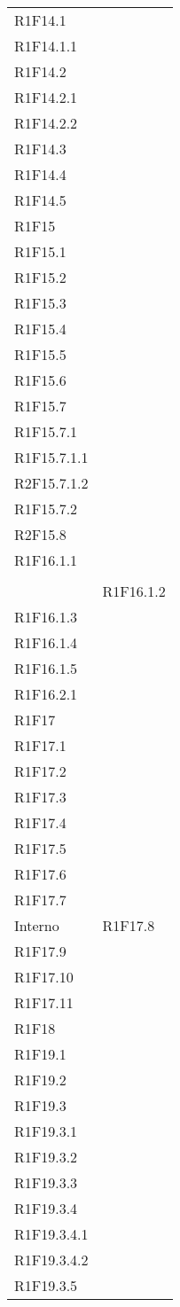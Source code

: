 \begin{longtable}{ >{\centering}p{}
			>{\centering}p{}}
		R1F14.1\\
		R1F14.1.1\\
		R1F14.2\\
		R1F14.2.1\\
		R1F14.2.2\\
		R1F14.3\\
		R1F14.4\\
		R1F14.5\\
		R1F15\\
		R1F15.1\\
		R1F15.2\\
		R1F15.3\\
		R1F15.4\\
		R1F15.5\\
		R1F15.6\\
		R1F15.7\\
		R1F15.7.1\\
		R1F15.7.1.1\\
		R2F15.7.1.2\\
		R1F15.7.2\\
		R2F15.8\\
		R1F16.1.1
		\tabularnewline \rowcolordark
		&
		\tabularnewline 
		&
		R1F16.1.2\\
		R1F16.1.3\\
		R1F16.1.4\\
		R1F16.1.5\\
		R1F16.2.1\\
		R1F17\\
		R1F17.1\\
		R1F17.2\\
		R1F17.3\\
		R1F17.4\\
		R1F17.5\\
		R1F17.6\\
		R1F17.7 \tabularnewline
		Interno	&
		R1F17.8\\
		R1F17.9\\
		R1F17.10\\
		R1F17.11\\
		R1F18\\
		R1F19.1\\
		R1F19.2\\
		R1F19.3\\
		R1F19.3.1\\
		R1F19.3.2\\
		R1F19.3.3\\
		R1F19.3.4\\
		R1F19.3.4.1\\
		R1F19.3.4.2\\
		R1F19.3.5\\		

\end{longtable}
